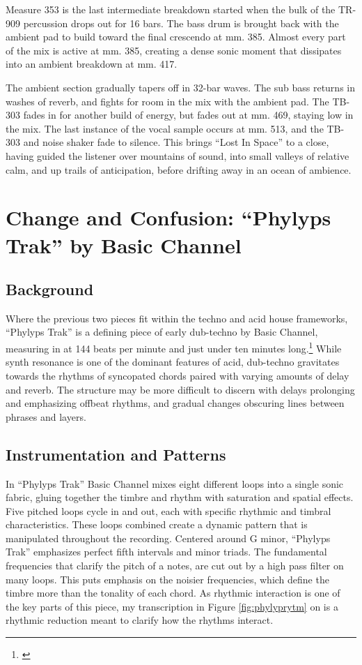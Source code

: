 \documentclass[12pt,twoside]{reedthesis}
\begin{document}
Measure 353 is the last intermediate breakdown started when the bulk of the TR-909 percussion drops out for 16 bars. The bass drum is brought back with the ambient pad to build toward the final crescendo at mm. 385. Almost every part of the mix is active at mm. 385, creating a dense sonic moment that dissipates into an ambient breakdown at mm. 417.

The ambient section gradually tapers off in 32-bar waves. The sub bass returns in washes of reverb, and fights for room in the mix with the ambient pad. The TB-303 fades in for another build of energy, but fades out at mm. 469, staying low in the mix. The last instance of the vocal sample occurs at mm. 513, and the TB-303 and noise shaker fade to silence. This brings ``Lost In Space'' to a close, having guided the listener over mountains of sound, into small valleys of relative calm, and up trails of anticipation, before drifting away in an ocean of ambience.


\newpage
\section{Change and Confusion: ``Phylyps Trak'' by Basic Channel}
\label{sec:phylyps}

\subsection{Background}

Where the previous two pieces fit within the techno and acid house frameworks, ``Phylyps Trak'' is a defining piece of early dub-techno by Basic Channel, measuring in at 144 beats per minute and just under ten minutes long.\footnote{\cite{basicchannelPhylypsTrak1993}}  While synth resonance is one of the dominant features of acid, dub-techno gravitates towards the rhythms of syncopated chords paired with varying amounts of delay and reverb. The structure may be more difficult to discern with delays prolonging and emphasizing offbeat rhythms, and gradual changes obscuring lines between phrases and layers.

\subsection{Instrumentation and Patterns}

In ``Phylyps Trak'' Basic Channel mixes eight different loops into a single sonic fabric, gluing together the timbre and rhythm with saturation and spatial effects. Five pitched loops cycle in and out, each with specific rhythmic and timbral characteristics. These loops combined create a dynamic pattern that is manipulated throughout the recording. Centered around G minor, ``Phylyps Trak'' emphasizes perfect fifth intervals and minor triads. The fundamental frequencies that clarify the pitch of a notes, are cut out by a high pass filter on many loops. This puts emphasis on the noisier frequencies, which define the timbre more than the tonality of each chord. As rhythmic interaction is one of the key parts of this piece, my transcription in Figure \ref{fig:phylyprytm} on \pageref{fig:phylyprytm} is a rhythmic reduction meant to clarify how the rhythms interact.
\end{document}
